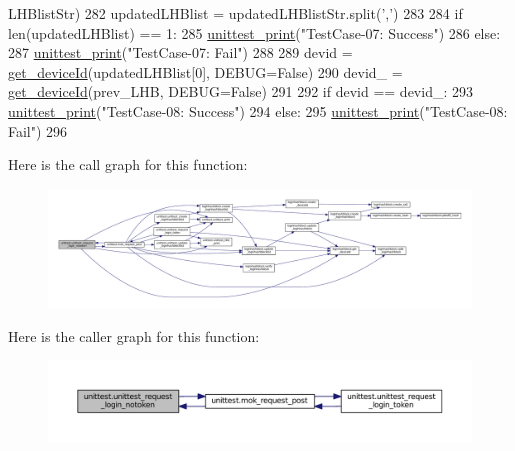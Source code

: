 \begin{DoxyCode}
      LHBlistStr)
282     updatedLHBlist = updatedLHBlistStr.split(\textcolor{stringliteral}{','})
283 
284     \textcolor{keywordflow}{if} len(updatedLHBlist) == 1:
285         \hyperlink{namespaceunittest_a217a1a3af5bc9748f2f6194bf79402bc}{unittest\_print}(\textcolor{stringliteral}{"TestCase-07: Success"})
286     \textcolor{keywordflow}{else}:
287         \hyperlink{namespaceunittest_a217a1a3af5bc9748f2f6194bf79402bc}{unittest\_print}(\textcolor{stringliteral}{"TestCase-07: Fail"})
288 
289     devid = \hyperlink{namespaceloginhashblock_a17417f2f6bca76ab51170082a562e5f6}{get\_deviceId}(updatedLHBlist[0], DEBUG=\textcolor{keyword}{False})
290     devid\_ = \hyperlink{namespaceloginhashblock_a17417f2f6bca76ab51170082a562e5f6}{get\_deviceId}(prev\_LHB, DEBUG=\textcolor{keyword}{False})
291 
292     \textcolor{keywordflow}{if} devid == devid\_:
293         \hyperlink{namespaceunittest_a217a1a3af5bc9748f2f6194bf79402bc}{unittest\_print}(\textcolor{stringliteral}{"TestCase-08: Success"})
294     \textcolor{keywordflow}{else}:
295         \hyperlink{namespaceunittest_a217a1a3af5bc9748f2f6194bf79402bc}{unittest\_print}(\textcolor{stringliteral}{"TestCase-08: Fail"})
296 
\end{DoxyCode}


Here is the call graph for this function\+:
\nopagebreak
\begin{figure}[H]
\begin{center}
\leavevmode
\includegraphics[width=350pt]{namespaceunittest_a8b30a1b14f91e9e9d093c13a7e68ee93_cgraph}
\end{center}
\end{figure}




Here is the caller graph for this function\+:
\nopagebreak
\begin{figure}[H]
\begin{center}
\leavevmode
\includegraphics[width=350pt]{namespaceunittest_a8b30a1b14f91e9e9d093c13a7e68ee93_icgraph}
\end{center}
\end{figure}


